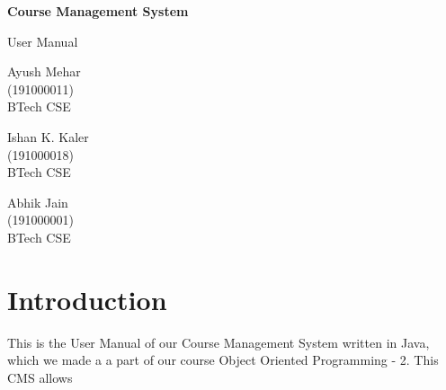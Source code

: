 \documentclass{article}
\author{Abhik Jain, Ayush Mehar \& Ishan Kumar Kaler}
\begin{document}
\vspace*{6em}

\begin{center}
{\huge \bfseries{Course Management System}} \\

\vspace*{3em}

{\huge User Manual}
\end{center}


\vspace*{6em}

\begin{minipage}{0.3\textwidth}
\begin{center}
Ayush Mehar \\
(191000011) \\
BTech CSE \\
\end{center}
\end{minipage}
\begin{minipage}{0.3\textwidth}
\begin{center}
Ishan K. Kaler \\
(191000018) \\
BTech CSE
\end{center}
\end{minipage}
\begin{minipage}{0.3\textwidth}
\begin{center}
Abhik Jain \\
(191000001) \\
BTech CSE \\
\end{center}
\end{minipage}

\makeindex

\section{Introduction}

This is the User Manual of our Course Management System written in Java, which we made a a part of our course Object Oriented Programming - 2. This CMS allows
\end{document}

